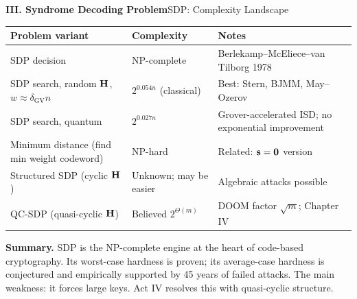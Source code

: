 \begin{frame}[shrink=5]{\textbf{III. Syndrome Decoding Problem}}{SDP: Complexity Landscape}
\begin{center}
\renewcommand{\arraystretch}{1.24}
\begin{tabular}{p{}p{}p{}}
\toprule
Problem variant & Complexity & Notes \\
\midrule
SDP decision & NP-complete & Berlekamp--McEliece--van Tilborg 1978 \\
SDP search, random $\mathbf{H}$, $w\approx\delta_\mathrm{GV}n$ & $2^{0.054n}$ (classical) & Best: Stern, BJMM, May--Ozerov \\
SDP search, quantum & $2^{0.027n}$ & Grover-accelerated ISD; no exponential improvement \\
Minimum distance (find min weight codeword) & NP-hard & Related: $\mathbf{s}=\mathbf{0}$ version \\
Structured SDP (cyclic $\mathbf{H}$) & Unknown; may be easier & Algebraic attacks possible \\
QC-SDP (quasi-cyclic $\mathbf{H}$) & Believed $2^{\Theta(m)}$ & DOOM factor $\sqrt{m}$; Chapter IV \\
\bottomrule
\end{tabular}
\end{center}
\vspace{-.1cm}
\textbf{Summary.}\; SDP is the NP-complete engine at the heart of code-based cryptography.
Its worst-case hardness is proven; its average-case hardness is conjectured and empirically supported by 45 years of failed attacks.
The main weakness: it forces large keys.
Act IV resolves this with quasi-cyclic structure.
\end{frame}
